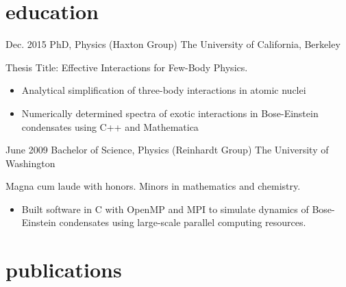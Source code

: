 \documentclass[]{friggeri-cv} %
\begin{document}

\section{education}

\begin{entrylist}
\entry
{Dec. 2015}
{PhD, {\normalfont  Physics (Haxton Group)}}
{The University of California, Berkeley}
{Thesis Title: Effective Interactions for Few-Body Physics. 
\begin{itemize}
\item Analytical simplification of three-body interactions in atomic nuclei 
\item Numerically determined spectra of exotic interactions in Bose-Einstein condensates using C++ and Mathematica
\end{itemize}}
\entry
{June 2009}
{Bachelor of Science, {\normalfont Physics (Reinhardt Group)}}
{The University of Washington}
{Magna cum laude with honors. Minors in mathematics and chemistry. 
\begin{itemize}
\item Built software in C with OpenMP and MPI to simulate dynamics of Bose-Einstein condensates using large-scale parallel computing resources.
\end{itemize}}
\end{entrylist}


\section{publications}
\newrefcontext[sorting=chronological]%
    \nocite{*}%
    \printbibliography[heading=none]%


\end{document}
